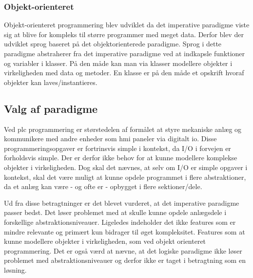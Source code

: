 \subsubsection*{Objekt-orienteret}
Objekt-orienteret programmering blev udviklet da det imperative paradigme viste sig at blive for kompleks til større programmer med meget data. Derfor blev der udviklet sprog baseret på det objektorienterede paradigme. Sprog i dette paradigme abstraherer fra det imperative paradigme ved at indkapsle funktioner og variabler i klasser. På den måde kan man via klasser modellere objekter i virkeligheden med data og metoder. En klasse er på den måde et opskrift hvoraf objekter kan laves/instantieres.

\subsection{Valg af paradigme}\label{ssec:paradigmevalg}
Ved \gls{plc} programmering er størstedelen af formålet at styre mekaniske anlæg og kommunikere med andre enheder som \gls{hmi} paneler via digitalt \gls{io}. Disse programmeringsopgaver er fortrinsvis simple i kontekst, da I/O i forvejen er forholdsvis simple. Der er derfor ikke behov for at kunne modellere komplekse objekter i virkeligheden. Dog skal det nævnes, at selv om I/O er simple opgaver i kontekst, skal det være muligt at kunne opdele programmet i flere abstraktioner, da et anlæg kan være - og ofte er - opbygget i flere sektioner/dele.

Ud fra disse betragtninger er det blevet vurderet, at det imperative paradigme passer bedst. Det løser problemet med at skulle kunne opdele anlægsdele i forskellige abstraktionsniveauer. Ligeledes indeholder det ikke features som er mindre relevante og primært kun bidrager til øget kompleksitet. Features som at kunne modellere objekter i virkeligheden, som ved objekt orienteret programmering. Det er også værd at nævne, at det logiske paradigme ikke løser problemet med abstraktionsniveauer og derfor ikke er taget i betragtning som en løsning.